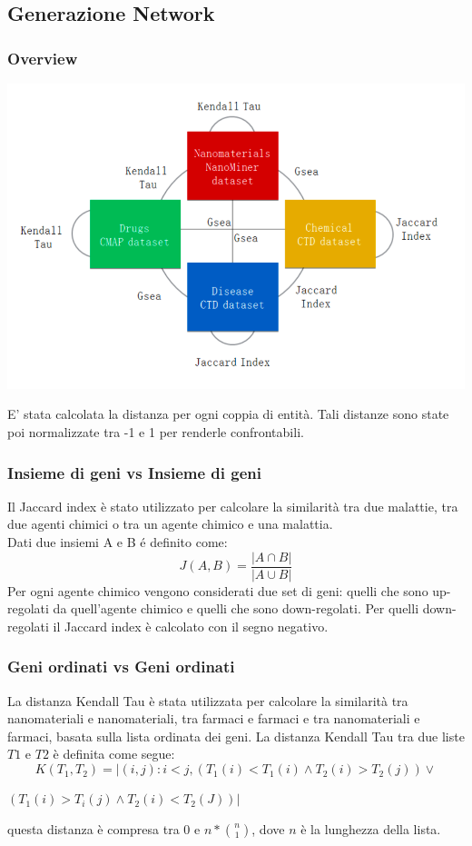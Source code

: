 \documentclass{beamer}
\begin{document}
\subsection{Generazione Network}
\begin{frame}
\frametitle{Overview}
\begin{center}
\includegraphics[scale=0.27]{img/OverviewGraph.png}
\end{center}
E' stata calcolata la distanza per ogni coppia di entità. Tali distanze sono state poi normalizzate tra -1 e 1 per renderle confrontabili.
\end{frame}

\begin{frame}
\frametitle{Insieme di geni vs Insieme di geni}
Il Jaccard index è stato utilizzato per calcolare la similarità tra due malattie, tra due agenti chimici o tra un agente chimico e una malattia.\\
Dati due insiemi A e B \'e definito come:
\begin{equation} 
J(A, B) = \frac{|A \cap B|}{|A \cup  B|}
\end{equation}
Per ogni agente chimico vengono considerati due set di geni: quelli che sono up-regolati da quell'agente chimico e quelli che sono down-regolati.
Per quelli down-regolati il Jaccard index è calcolato con il segno negativo.
\end{frame}

\begin{frame}
\frametitle{Geni ordinati vs Geni ordinati}
La distanza Kendall Tau è stata utilizzata per calcolare la similarità tra nanomateriali e nanomateriali, tra farmaci e farmaci e tra nanomateriali e farmaci, basata sulla lista ordinata dei geni.
La distanza Kendall Tau tra due liste $T1$ e $T2$ è definita come segue:
\begin{equation}
K(T_1, T_2) = |(i, j): i < j, (T_1(i) < T_1(i) \wedge  T_2(i) > T_2(j)) \vee
\end{equation}
\begin{center}
	$ (T_1(i) > T_i(j) \wedge T_2(i) < T_2(J))  | $
\end{center}
questa distanza è compresa tra 0 e $n*\binom{n}{1}$, dove $n$ è la lunghezza della lista. 
\end{frame}
\end{document}
